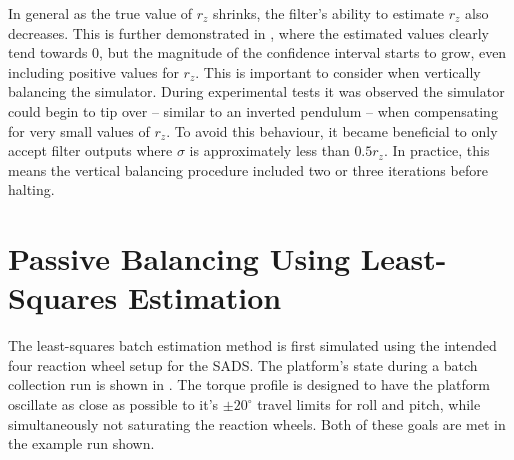 In general as the true value of $r_z$ shrinks, the filter's ability to estimate $r_z$ also decreases. This is further demonstrated in , where the estimated values clearly tend towards 0, but the magnitude of the confidence interval starts to grow, even including positive values for $r_z$. This is important to consider when vertically balancing the simulator. During experimental tests it was observed the simulator could begin to tip over -- similar to an inverted pendulum -- when compensating for very small values of $r_z$. To avoid this behaviour, it became beneficial to only accept filter outputs where $\sigma$ is approximately less than $0.5r_z$. In practice, this means the vertical balancing procedure included two or three iterations before halting. 





\section{Passive Balancing Using Least-Squares Estimation}

The least-squares batch estimation method is first simulated using the intended four reaction wheel setup for the SADS. The platform's state during a batch collection run is shown in . The torque profile is designed to have the platform oscillate as close as possible to it's $\pm20^{\circ}$ travel limits for roll and pitch, while simultaneously not saturating the reaction wheels. Both of these goals are met in the example run shown.

